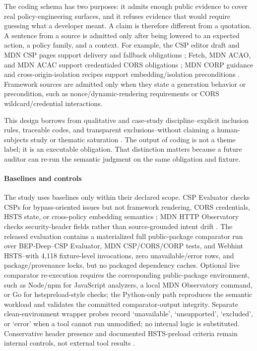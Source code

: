 \documentclass[10pt,conference]{IEEEtran}
\begin{document}
The coding schema has two purposes: it admits enough public evidence to cover real policy-engineering surfaces, and it refuses evidence that would require guessing what a developer meant. A claim is therefore different from a quotation. A sentence from a source is admitted only after being lowered to an expected action, a policy family, and a context. For example, the CSP editor draft and MDN CSP pages support delivery and fallback obligations \cite{w3c_csp3_2026,mdn_csp_header_2026}; Fetch, MDN ACAO, and MDN ACAC support credentialed CORS obligations \cite{whatwg_fetch_2026}; MDN CORP guidance and cross-origin-isolation recipes support embedding/isolation preconditions \cite{mdn_corp_guide_2026,webdev_coop_coep,webdev_coop_coep_recipe,webdev_cross_origin_isolation_guide,mdn_cross_origin_isolated,mdn_sharedarraybuffer}. Framework sources are admitted only when they state a generation behavior or precondition, such as nonce/dynamic-rendering requirements or CORS wildcard/credential interactions.


This design borrows from qualitative and case-study discipline--explicit inclusion rules, traceable codes, and transparent exclusions--without claiming a human-subjects study or thematic saturation \cite{runeson_case_study_2012}. The output of coding is not a theme label; it is an executable obligation. That distinction matters because a future auditor can re-run the semantic judgment on the same obligation and fixture.

\paragraph{Baselines and controls}

The study uses baselines only within their declared scope. CSP Evaluator checks CSPs for bypass-oriented issues but not framework rendering, CORS credentials, HSTS state, or cross-policy embedding semantics \cite{google_csp_evaluator_2026}; MDN HTTP Observatory checks security-header fields rather than source-grounded intent drift \cite{mdn_http_observatory_2026}. The released evaluation contains a materialized full public-package comparator run over BEP-Deep--CSP Evaluator, MDN CSP/CORS/CORP tests, and Webhint HSTS--with 4,118 fixture-level invocations, zero unavailable/error rows, and package/provenance locks, but no packaged dependency caches. Optional live comparator re-execution requires the corresponding public-package environment, such as Node/npm for JavaScript analyzers, a local MDN Observatory command, or Go for hstspreload-style checks; the Python-only path reproduces the semantic workload and validates the committed comparator-output integrity. Separate clean-environment wrapper probes record `unavailable', `unsupported', `excluded', or `error' when a tool cannot run unmodified; no internal logic is substituted. Conservative header presence and documented HSTS-preload criteria remain internal controls, not external tool results \cite{chromium_hstspreload_2025,hstspreload_org}.
\end{document}
